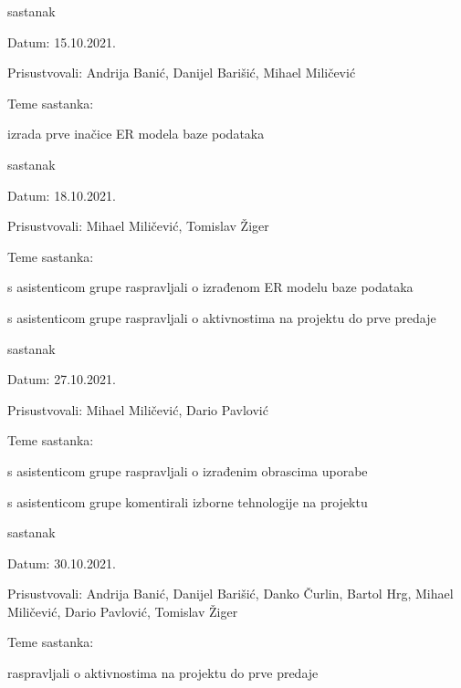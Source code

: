 \begin{packed_enum}
			\item  sastanak
			\item[] \begin{packed_item}
				\item Datum: 15.10.2021.
				\item Prisustvovali: Andrija Banić, Danijel Barišić, Mihael Miličević
				\item Teme sastanka:
				\begin{packed_item}
					\item  izrada prve inačice ER modela baze podataka
				\end{packed_item}
			\end{packed_item}
			
			\item  sastanak
			\item[] \begin{packed_item}
				\item Datum: 18.10.2021.
				\item Prisustvovali: Mihael Miličević, Tomislav Žiger
				\item Teme sastanka:
				\begin{packed_item}
					\item  s asistenticom grupe raspravljali o izrađenom ER modelu baze podataka
					\item  s asistenticom grupe raspravljali o aktivnostima na projektu do prve predaje
				\end{packed_item}
			\end{packed_item}
			
			\item  sastanak
			\item[] \begin{packed_item}
				\item Datum: 27.10.2021.
				\item Prisustvovali: Mihael Miličević, Dario Pavlović
				\item Teme sastanka:
				\begin{packed_item}
					\item  s asistenticom grupe raspravljali o izrađenim obrascima uporabe
					\item  s asistenticom grupe komentirali izborne tehnologije na projektu
				\end{packed_item}
			\end{packed_item}
			
			\item  sastanak
			\item[] \begin{packed_item}
				\item Datum: 30.10.2021.
				\item Prisustvovali: Andrija Banić, Danijel Barišić, Danko Čurlin, Bartol Hrg, Mihael Miličević, Dario Pavlović, Tomislav Žiger
				\item Teme sastanka:
				\begin{packed_item}
					\item  raspravljali o aktivnostima na projektu do prve predaje
				\end{packed_item}
			\end{packed_item}
			

\end{packed_enum}
